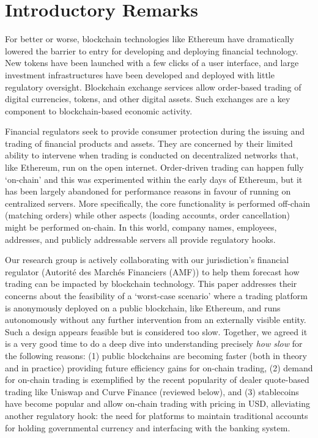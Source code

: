 
\section{Introductory Remarks}

For better or worse, blockchain technologies like Ethereum have dramatically lowered the barrier to entry for developing and deploying financial technology. New tokens have been launched with a few clicks of a user interface, and large investment infrastructures have been developed and deployed with little regulatory oversight. Blockchain exchange services allow order-based trading of digital currencies, tokens, and other digital assets. Such exchanges are a key component to blockchain-based economic activity. 

Financial regulators seek to provide consumer protection during the issuing and trading of financial products and assets. They are concerned by their limited ability to intervene when trading is conducted on decentralized networks that, like Ethereum, run on the open internet. Order-driven trading can happen fully `on-chain' and this was experimented within the early days of Ethereum, but it has been largely abandoned for performance reasons in favour of running on centralized servers. More specifically, the core functionality is performed off-chain (\eg matching orders) while other aspects (\eg loading accounts, order cancellation) might be performed on-chain. In this world, company names, employees, addresses, and publicly addressable servers all provide regulatory hooks.

Our research group is actively collaborating with our jurisdiction's financial regulator (Autorité des Marchés Financiers (AMF)) to help them forecast how trading can be impacted by blockchain technology. This paper addresses their concerns about the feasibility of a `worst-case scenario' where a trading platform is anonymously deployed on a public blockchain, like Ethereum, and runs autonomously without any further intervention from an externally visible entity. Such a design appears feasible but is considered too slow. Together, we agreed it is a very good time to do a deep dive into understanding precisely \textit{how slow} for the following reasons: (1) public blockchains are becoming faster (both in theory and in practice) providing future efficiency gains for on-chain trading, (2) demand for on-chain trading is exemplified by the recent popularity of dealer quote-based trading like Uniswap and Curve Finance (reviewed below), and (3) stablecoins have become popular and allow on-chain trading with pricing in USD, alleviating another regulatory hook: the need for platforms to maintain traditional accounts for holding governmental currency and interfacing with the banking system.

